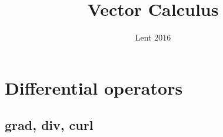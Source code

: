 \documentclass[a4paper]{article}
\begin{document}
\title{Vector Calculus}
\date{Lent 2016}

\maketitle

\newpage

\tableofcontents

\newpage

\section{Differential operators}
\subsection{grad, div, curl}
\end{document}

